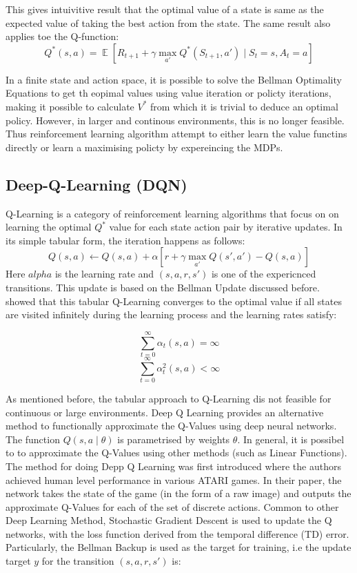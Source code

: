 \documentclass[12pt,a4paper]{report}
\DeclareMathOperator{\EX}{\mathbb{E}}
\begin{document}
This gives intuivitive result that the optimal value of a state is same as the expected value of taking the best action from the state. The same result also applies toe the Q-function:
\[
Q^*(s, a) = \EX [ R_{t+1} + \gamma \max_{a'} Q^*(S_{t+1}, a') \mid S_t = s, A_t = a ]
\]

In a finite state and action space, it is possible to solve the Bellman Optimality Equations to get th eopimal values using value iteration or policty iterations, making it possible to calculate $V^*$ from which it is trivial to deduce an optimal policy. However, in larger and continous environments, this is no longer feasible. Thus reinforcement learning algorithm attempt to either learn the value functins directly or learn a maximising policty by expereincing the MDPs. 


\subsection{Deep-Q-Learning (DQN)}

Q-Learning is a category of reinforcement learning algorithms that focus on on learning the optimal $Q^*$ value for each state action pair by iterative updates. In its simple tabular form, the iteration happens as follows:
\[Q(s, a) \leftarrow Q(s, a) + \alpha [ r + \gamma \max_{a'} Q(s', a') - Q(s, a) ]\]
Here $alpha$ is the learning rate and $(s,a,r,s')$ is one of the expericnced transitions. This update is based on the Bellman Update discussed before. \cite{Watkins1992} showed that this tabular Q-Learning converges to the optimal value if all states are visited infinitely during the learning process and the learning rates satisfy: 

\[
\sum_{t=0}^{\infty} \alpha_t(s, a) = \infty
\]
\[
\sum_{t=0}^{\infty} \alpha_t^2(s, a) < \infty
\]

As mentioned before, the tabular approach to Q-Learning dis not feasible for continuous or large environments. Deep Q Learning provides an alternative method to functionally approximate the Q-Values using deep neural networks. The function $Q(s, a \mid \theta)$ is parametrised by weights $\theta$. In general, it is possibel to to approximate the Q-Values using other methods (such as Linear Functions).
The method for doing Depp Q Learning was first introduced \cite{Mnih2015} where the authors achieved human level performance in various ATARI games. In their paper, the network takes the state of the game (in the form of a raw image) and outputs the approximate Q-Values for each of the set of discrete actions. Common to other Deep Learning Method, Stochastic Gradient Descent is used to update the Q networks, with the loss function derived from the temporal difference (TD) error. Particularly, the Bellman Backup is used as the target for training, i.e the update target $y$ for the transition $(s, a, r, s')$ is: 
\end{document}

